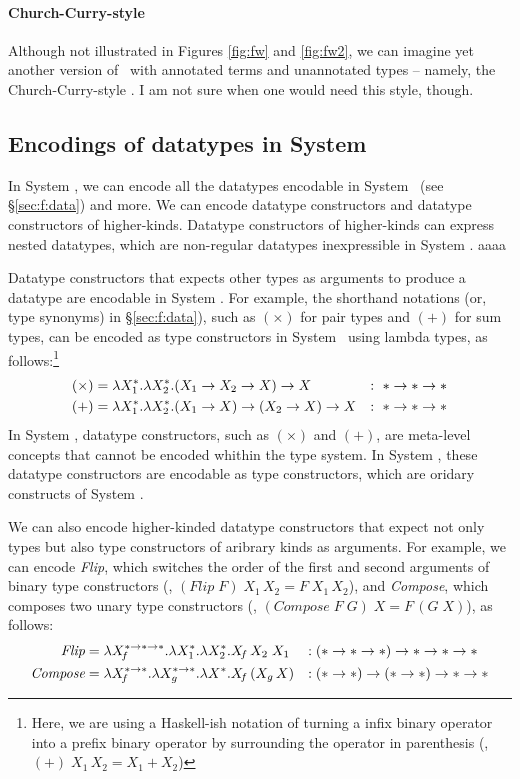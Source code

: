 \paragraph{Church-Curry-style \Fw}
Although not illustrated in Figures \ref{fig:fw} and \ref{fig:fw2},
we can imagine yet another version of \Fw\ with annotated terms
and unannotated types -- namely, the Church-Curry-style \Fw.
I am not sure when one would need this style, though.

\subsection{Encodings of datatypes in System \Fw}
\label{sec:fw:data}
In System \Fw, we can encode all the datatypes encodable in System \F\ (see
\S\ref{sec:f:data}) and more. We can encode datatype constructors and
datatype constructors of higher-kinds. Datatype constructors of higher-kinds
can express nested datatypes, which are non-regular datatypes inexpressible
in System \F. aaaa

Datatype constructors that expects other types as arguments to produce
a datatype are encodable in System \Fw. For example, the shorthand notations
(or, type synonyms) in \S\ref{sec:f:data}), such as $(\times)$ for pair types
and $(+)$ for sum types, can be encoded as type constructors in System \Fw\ 
using lambda types, as follows:\footnote{Here,
	we are using a Haskell-ish notation of turning a infix binary operator
	into a prefix binary operator by surrounding the operator in parenthesis
	(\eg, $(+)\;X_1\,X_2 = X_1 + X_2$)}
\begin{align*}
(\times) &= \lambda X_1^{*}.\lambda X_2^{*}.(X_1 -> X_2 -> X) -> X &:~ * -> * -> * \\
     (+) &= \lambda X_1^{*}.\lambda X_2^{*}.(X_1 -> X) -> (X_2 -> X) -> X &:~ * -> * -> *
\end{align*}
In System \F, datatype constructors, such as $(\times)$ and $(+)$, are
meta-level concepts that cannot be encoded whithin the type system.
In System \Fw, these datatype constructors are encodable as type constructors,
which are oridary constructs of System \Fw.

We can also encode higher-kinded datatype constructors that expect
not only types but also type constructors of aribrary kinds as arguments.
For example, we can encode \textit{Flip}, which switches the order of
the first and second arguments of binary type constructors
(\ie, $(\textit{Flip}\;F)\;X_1\,X_2 = F\;X_1\,X_2$),
and \textit{Compose}, which composes two unary type constructors
(\ie, $(\textit{Compose}\;F\;G)\;X = F\,(G\;X)$), as follows:
\begin{align*}
\textit{Flip} &= \lambda X_{\!f}^{*-> *-> *}.\lambda X_1^{*}.\lambda X_2^{*}.X_{\!f}\,X_2\;X_1
		     &:\;& (* -> * -> *) -> * -> * -> * \\
\textit{Compose} &= \lambda X_{\!f}^{*-> *}.\lambda X_g^{*-> *}.\lambda X^{*}.X_{\!f}\,(X_g\,X)
		     &:\;& (* -> *) -> (* -> *) -> * -> *
\end{align*}

